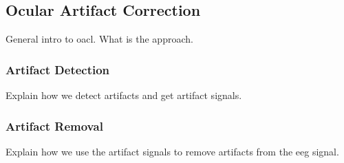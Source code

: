 \subsection{Ocular Artifact Correction}
General intro to oacl. What is the approach.

\subsubsection{Artifact Detection}
Explain how we detect artifacts and get artifact signals.

\subsubsection{Artifact Removal}
Explain how we use the artifact signals to remove artifacts from the eeg signal.